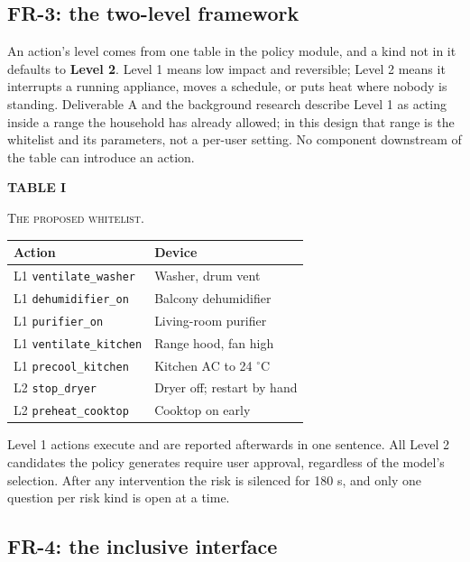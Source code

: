 \documentclass[conference]{IEEEtran}
\begin{document}
\subsection{FR-3: the two-level framework}

An action's level comes from one table in the policy module, and a kind not in it defaults to \textbf{Level 2}. Level 1 means low impact and reversible; Level 2 means it interrupts a running appliance, moves a schedule, or puts heat where nobody is standing. Deliverable A and the background research describe Level 1 as acting inside a range the household has already allowed; in this design that range is the whitelist and its parameters, not a per-user setting. No component downstream of the table can introduce an action.

\begin{center}
{\scshape\bfseries TABLE I\par}
{\footnotesize\scshape The proposed whitelist.\par}
\vspace{2pt}
\footnotesize
\begin{tabular}{@{}>{\raggedright\arraybackslash}p{}>{\raggedright\arraybackslash}p{}@{}}
\hline
\textbf{Action} & \textbf{Device} \\
\hline
L1 \texttt{ventilate\_washer} & Washer, drum vent \\
L1 \texttt{dehumidifier\_on} & Balcony dehumidifier \\
L1 \texttt{purifier\_on} & Living-room purifier \\
L1 \texttt{ventilate\_kitchen} & Range hood, fan high \\
L1 \texttt{precool\_kitchen} & Kitchen AC to 24 $^{\circ}$C \\
L2 \texttt{stop\_dryer} & Dryer off; restart by hand \\
L2 \texttt{preheat\_cooktop} & Cooktop on early \\
\hline
\end{tabular}
\end{center}

Level 1 actions execute and are reported afterwards in one sentence. All Level 2 candidates the policy generates require user approval, regardless of the model's selection. After any intervention the risk is silenced for 180 s, and only one question per risk kind is open at a time.

\subsection{FR-4: the inclusive interface}
\end{document}
